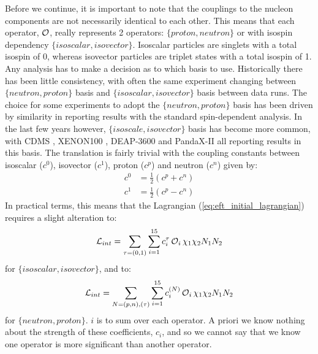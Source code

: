 \par
Before we continue, it is important to note that the couplings to the nucleon components are not necessarily identical to each other.
This means that each operator, $\operatorname{\mathcal{O}}$, really represents 2 operators: $\{proton,neutron\}$ or with isospin dependency $\{isoscalar,isovector\}$.
Isoscalar particles are singlets with a total isospin of 0, whereas isovector particles are triplet states with a total isospin of 1.
Any analysis has to make a decision as to which basis to use.
Historically there has been little consistency, with often the same experiment changing between $\{neutron, proton\}$ basis and $\{isoscalar, isovector\}$ basis between data runs.
The choice for some experiments to adopt the $\{neutron, proton\}$ basis has been driven by similarity in reporting results with the standard spin-dependent analysis.
In the last few years however, $\{isoscale, isovector\}$ basis has become more common, with CDMS \cite{cdms_eft_ref}, XENON100 \cite{xenon100_eft_ref}, DEAP-3600 \cite{deap3600_eft_ref} and PandaX-II \cite{pandax_2_eft_ref} all reporting results in this basis.
The translation is fairly trivial with the coupling constants between isoscalar ($c^0$), isovector ($c^1$), proton ($c^p$) and neutron ($c^n$) given by:
\begin{equation}
\begin{split}
    c^0 &= \frac{1}{2}(c^p + c^n)  \\
    c^1 &= \frac{1}{2}(c^p - c^n) 
\end{split}
\label{eq:eft_iso_to_pn}
\end{equation}
In practical terms, this means that the Lagrangian (\autoref{eq:eft_initial_lagrangian}) requires a slight alteration to:
\begin{equation}
    \mathcal{L}_{int}  = \sum_{\tau = (0,1)} \sum^{15}_{i=1}c^{\tau}_{i} \operatorname{\mathcal{O}}_i \chi_1 \chi_2 N_1 N_2
\end{equation}
for $\{isoscalar,isovector\}$, and to:
\begin{equation}
    \mathcal{L}_{int} = \sum_{N = (p,n),(\tau)} \sum^{15}_{i=1}c^{(N)}_{i} \operatorname{\mathcal{O}}_i \chi_1 \chi_2 N_1 N_2
\end{equation}
for $\{neutron,proton\}$.
$i$ is to sum over each operator.
A priori we know nothing about the strength of these coefficients, $c_i$, and so we cannot say that we know one operator is more significant than another operator.

